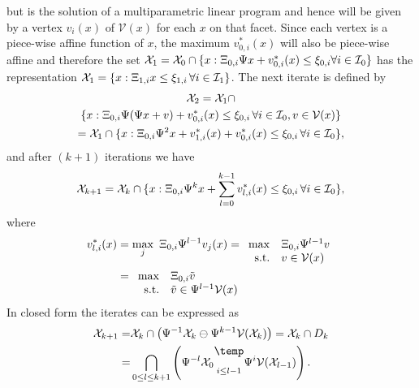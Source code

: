 \documentclass[letterpaper, 10pt, conference]{ieeeconf} %
\newcommand{\bigominus}{\raisebox{10pt}{$\temp$}}
\begin{document}
but is the solution of a multiparametric linear program and hence will be given 
by a vertex $v_i(x)$ of $\mathcal V(x)$ for each $x$ on that facet.
Since each vertex is a piece-wise affine function of $x$, the maximum $v_{0,i}^\ast(x)$ will also
be piece-wise affine
and therefore the set $\mathcal X_1=\mathcal X_0 \cap \{x:\Xi_{0,i}\Psi x + v_{0,i}^\ast(x) \leq 
\xi_{0,i}\forall i\in\mathcal I_0\}$
has the representation $\mathcal X_1 = \{x:\Xi_{1,i}x\leq\xi_{1,i}\,\forall i\in\mathcal I_1\}$.
The next iterate is defined by
%
\begin{multline*}
	\mathcal X_2 = \mathcal X_1 \cap \\ \{x:\Xi_{0,i}\Psi(\Psi x + v) + v_{0,i}^\ast(x)\leq\xi_{0,i}\,
	\forall i\in\mathcal I_0,v\in\mathcal V(x)\}\\
	= \mathcal X_1 \cap \{x: \Xi_{0,i}\Psi^2 x + v_{1,i}^\ast(x) + v_{0,i}^\ast(x)\leq\xi_{0,i}\,\forall 
	i\in\mathcal I_0\},
\end{multline*}
%
and after $(k+1)$ iterations we have
%
\[%
	\mathcal X_{k+1} = \mathcal X_k\cap \{x:\genmat_{0,i}\Psi^k x + \sum_{l=0}^{k-1}v_{l,i}^\ast(x)
	\leq\genvec_{0,i}\,\forall i\in\mathcal I_0\},
\]%
%
where 
%
\begin{align*}
	v_{l,i}^\ast(x)&=\max_j \ \genmat_{0,i}\Psi^{l-1}v_j(x)
	 = \begin{array}[t]{rl} \max& \genmat_{0,i}\Psi^{l-1}v \\ \text{s.t.}& v\in\mathcal V(x)\end{array} \\
	 &= \begin{array}[t]{rl} \max& \genmat_{0,i}\tilde v\\ \text{s.t.}& \tilde v\in \Psi^{l-1}\mathcal V(x) \end{array}
\end{align*}
%
In closed form the iterates can be expressed as
%
\begin{equation}\label{eq:set:iteration:state:dependent:constraints}
\begin{split}
	\mathcal X_{k+1} =& \mathcal X_k\cap\left(\Psi^{-1}\mathcal X_k \ominus \Psi^{k-1}\mathcal V(\mathcal X_k)\right)
	=\mathcal X_k\cap D_k \\
	=& \bigcap_{0\leq l\leq k+1}\left( \Psi^{-l} \mathcal X_0 \underset{i\leq l-1}{\bigominus} \Psi^i \mathcal V(\mathcal X_{l-1})\right).
\end{split}\end{equation}
\end{document}
